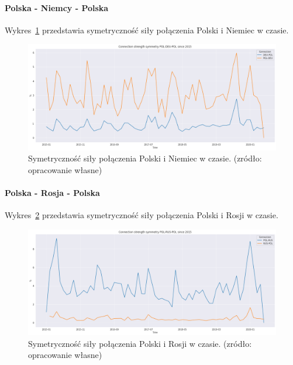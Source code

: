 \documentclass[11pt]{report}
\begin{document}
    \paragraph{Polska - Niemcy - Polska}

    Wykres~\ref{fig:POL-DEU-POL} przedstawia symetryczność siły połączenia Polski i Niemiec w czasie.


    \begin{figure}[ht]
        \centering
        \includegraphics[width=1 \textwidth]{fig/ConnectionSymmetry/POL-DEU-POL.png}
        \caption{Symetryczność siły połączenia Polski i Niemiec w czasie. (zródło: opracowanie własne)}
        \label{fig:POL-DEU-POL}
    \end{figure}

    \paragraph{Polska - Rosja - Polska}

    Wykres~\ref{fig:POL-RUS-POL} przedstawia symetryczność siły połączenia Polski i Rosji w czasie.


    \begin{figure}[ht]
        \centering
        \includegraphics[width=1 \textwidth]{fig/ConnectionSymmetry/POL-RUS-POL.png}
        \caption{Symetryczność siły połączenia Polski i Rosji w czasie. (zródło: opracowanie własne)}
        \label{fig:POL-RUS-POL}
    \end{figure}
\end{document}
